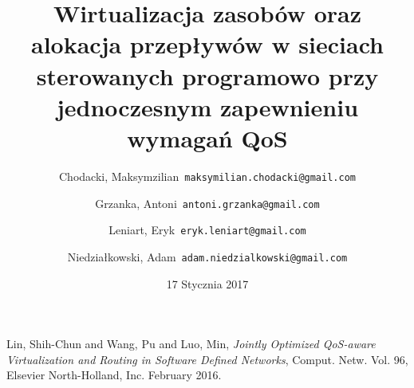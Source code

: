 \documentclass{article}
\title{Wirtualizacja zasobów oraz alokacja przepływów w sieciach sterowanych programowo przy jednoczesnym zapewnieniu wymagań QoS}
\author{
  Chodacki, Maksymzilian\      \texttt{maksymilian.chodacki@gmail.com}
  \and
  Grzanka, Antoni\      \texttt{antoni.grzanka@gmail.com}
  \and
  Leniart, Eryk\      \texttt{eryk.leniart@gmail.com}
  \and
  Niedziałkowski, Adam\      \texttt{adam.niedzialkowski@gmail.com}
}
\date{17 Stycznia 2017}
\begin{document}
\maketitle










\begin{thebibliography}

  Lin, Shih-Chun and Wang, Pu and Luo, Min,
  \emph{Jointly Optimized QoS-aware Virtualization and Routing in Software Defined Networks},
  Comput. Netw. Vol. 96,
  Elsevier North-Holland, Inc.
  February 2016.

\end{thebibliography}

\newpage

\end{document}
